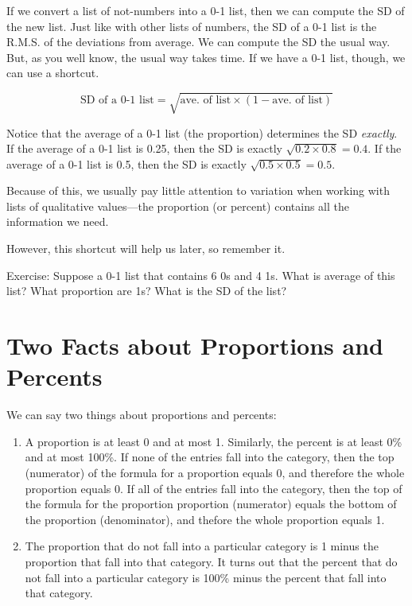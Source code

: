 \documentclass[]{book}
\providecommand{\tightlist}{%
  \setlength{\itemsep}{0pt}\setlength{\parskip}{0pt}}
\theoremstyle{definition}
\theoremstyle{definition}
\theoremstyle{definition}
\theoremstyle{remark}
\begin{document}
If we convert a list of not-numbers into a 0-1 list, then we can compute
the SD of the new list. Just like with other lists of numbers, the SD of
a 0-1 list is the R.M.S. of the deviations from average. We can compute
the SD the usual way. But, as you well know, the usual way takes time.
If we have a 0-1 list, though, we can use a shortcut.

\[\text{SD of a 0-1 list} = \sqrt{\text{ave. of list} \times (1 - \text{ave. of list})}\]

Notice that the average of a 0-1 list (the proportion) determines the SD
\emph{exactly}. If the average of a 0-1 list is 0.25, then the SD is
exactly \(\sqrt{0.2 \times 0.8} = 0.4\). If the average of a 0-1 list is
0.5, then the SD is exactly \(\sqrt{0.5 \times 0.5} = 0.5\).

Because of this, we usually pay little attention to variation when
working with lists of qualitative values---the proportion (or percent)
contains all the information we need.

However, this shortcut will help us later, so remember it.

Exercise: Suppose a 0-1 list that contains 6 0s and 4 1s. What is
average of this list? What proportion are 1s? What is the SD of the
list?

\section{Two Facts about Proportions and
Percents}\label{two-facts-about-proportions-and-percents}

We can say two things about proportions and percents:

\begin{enumerate}
\def\labelenumi{\arabic{enumi}.}
\tightlist
\item
  A proportion is at least 0 and at most 1. Similarly, the percent is at
  least 0\% and at most 100\%. If none of the entries fall into the
  category, then the top (numerator) of the formula for a proportion
  equals 0, and therefore the whole proportion equals 0. If all of the
  entries fall into the category, then the top of the formula for the
  proportion proportion (numerator) equals the bottom of the proportion
  (denominator), and thefore the whole proportion equals 1.
\item
  The proportion that do not fall into a particular category is 1 minus
  the proportion that fall into that category. It turns out that the
  percent that do not fall into a particular category is 100\% minus the
  percent that fall into that category.
\end{enumerate}
\end{document}
